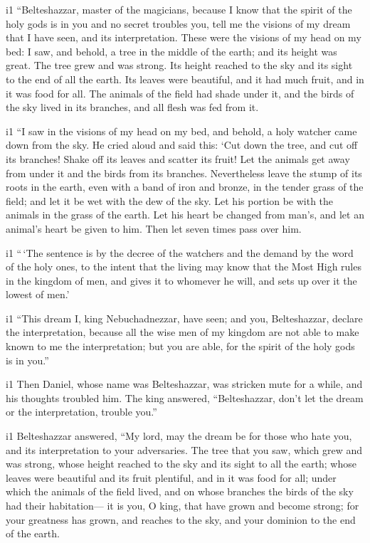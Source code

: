 i1  ``Belteshazzar, master of the magicians, because I
know that the spirit of the holy gods is in you and no secret troubles
you, tell me the visions of my dream that I have seen, and its
interpretation.  These were the visions of my head on my
bed: I saw, and behold, a tree in the middle of the earth; and its
height was great.  The tree grew and was strong. Its
height reached to the sky and its sight to the end of all the earth.
 Its leaves were beautiful, and it had much fruit, and in
it was food for all. The animals of the field had shade under it, and
the birds of the sky lived in its branches, and all flesh was fed from
it.

i1  ``I saw in the visions of my head on my bed, and
behold, a holy watcher came down from the sky.  He cried
aloud and said this: `Cut down the tree, and cut off its branches! Shake
off its leaves and scatter its fruit! Let the animals get away from
under it and the birds from its branches.  Nevertheless
leave the stump of its roots in the earth, even with a band of iron and
bronze, in the tender grass of the field; and let it be wet with the dew
of the sky. Let his portion be with the animals in the grass of the
earth.  Let his heart be changed from man's, and let an
animal's heart be given to him. Then let seven times pass over him.

i1  ``\,`The sentence is by the decree of the watchers
and the demand by the word of the holy ones, to the intent that the
living may know that the Most High rules in the kingdom of men, and
gives it to whomever he will, and sets up over it the lowest of men.'

i1  ``This dream I, king Nebuchadnezzar, have seen; and
you, Belteshazzar, declare the interpretation, because all the wise men
of my kingdom are not able to make known to me the interpretation; but
you are able, for the spirit of the holy gods is in you.''

i1  Then Daniel, whose name was Belteshazzar, was
stricken mute for a while, and his thoughts troubled him. The king
answered, ``Belteshazzar, don't let the dream or the interpretation,
trouble you.''

i1 Belteshazzar answered, ``My lord, may the dream be for those who hate
you, and its interpretation to your adversaries.  The
tree that you saw, which grew and was strong, whose height reached to
the sky and its sight to all the earth;  whose leaves
were beautiful and its fruit plentiful, and in it was food for all;
under which the animals of the field lived, and on whose branches the
birds of the sky had their habitation---  it is you, O
king, that have grown and become strong; for your greatness has grown,
and reaches to the sky, and your dominion to the end of the earth.


